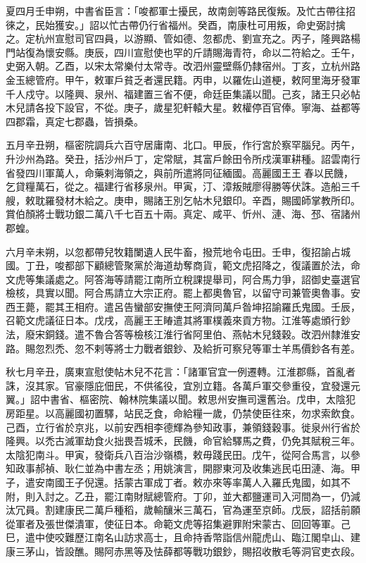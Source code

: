 \begin{pinyinscope}
 夏四月壬申朔，中書省臣言：「唆都軍士擾民，故南劍等路民復叛。及忙古帶往招徠之，民始獲安。」詔以忙古帶仍行省福州。癸酉，南康杜可用叛，命史弼討擒之。定杭州宣慰司官四員，以游顯、管如德、忽都虎、劉宣充之。丙子，隆興路楊門站復為懷安縣。庚辰，四川宣慰使也罕的斤請賜海青符，命以二符給之。壬午，史弼入朝。乙酉，以宋太常樂付太常寺。改泗州靈壁縣仍隸宿州。丁亥，立杭州路金玉總管府。甲午，敕軍戶貧乏者還民籍。丙申，以羅佐山道梗，敕阿里海牙發軍千人戍守。以隆興、泉州、福建置三省不便，命廷臣集議以聞。己亥，諸王只必帖木兒請各投下設官，不從。庚子，歲星犯軒轅大星。敕權停百官俸。寧海、益都等四郡霜，真定七郡蟲，皆損桑。



 五月辛丑朔，樞密院調兵六百守居庸南、北口。甲辰，作行宮於察罕腦兒。丙午，升沙州為路。癸丑，括沙州戶丁，定常賦，其富戶餘田令所戍漢軍耕種。詔雲南行省發四川軍萬人，命藥剌海領之，與前所遣將同征緬國。高麗國王王春以民饑，乞貸糧萬石，從之。福建行省移泉州。甲寅，汀、漳叛賊廖得勝等伏誅。造船三千艘，敕耽羅發材木給之。庚申，賜諸王別乞帖木兒銀印。辛酉，賜國師掌教所印。賞伯顏將士戰功銀二萬八千七百五十兩。真定、咸平、忻州、漣、海、邳、宿諸州郡蝗。



 六月辛未朔，以忽都帶兒牧籍闌遺人民牛畜，撥荒地令屯田。壬申，復招諭占城國。丁丑，唆都部下顧總管聚黨於海道劫奪商貨，範文虎招降之，復議置於法，命文虎等集議處之。阿答海等請罷江南所立稅課提舉司，阿合馬力爭，詔御史臺選官檢核，具實以聞。阿合馬請立大宗正府。罷上都奧魯官，以留守司兼管奧魯事。安西王薨，罷其王相府。遣呂告蠻部安撫使王阿濟同萬戶昝坤招諭羅氏鬼國。壬辰，召範文虎議征日本。戊戌，高麗王王睶遣其將軍樸義來貢方物。江淮等處頒行鈔法，廢宋銅錢。遣不魯合答等檢核江淮行省阿里伯、燕帖木兒錢穀。改泗州隸淮安路。賜忽烈禿、忽不剌等將士力戰者銀鈔、及給折可察兒等軍士羊馬價鈔各有差。



 秋七月辛丑，廣東宣慰使帖木兒不花言：「諸軍官宜一例遷轉。江淮郡縣，首亂者誅，沒其家。官豪隱庇佃民，不供徭役，宜別立籍。各萬戶軍交參重役，宜發還元翼。」詔中書省、樞密院、翰林院集議以聞。敕思州安撫司還舊治。戊申，太陰犯房距星。以高麗國初置驛，站民乏食，命給糧一歲，仍禁使臣往來，勿求索飲食。己酉，立行省於京兆，以前安西相李德輝為參知政事，兼領錢穀事。徙泉州行省於隆興。以禿古滅軍劫食火拙畏吾城禾，民饑，命官給驛馬之費，仍免其賦稅三年。太陰犯南斗。甲寅，發衛兵八百治沙嶺橋，敕毋踐民田。戊午，從阿合馬言，以參知政事郝禎、耿仁並為中書左丞；用姚演言，開膠東河及收集逃民屯田漣、海。甲子，遣安南國王子倪還。括蒙古軍成丁者。敕亦來等率萬人入羅氏鬼國，如其不附，則入討之。乙丑，罷江南財賦總管府。丁卯，並大都鹽運司入河間為一，仍減汰冗員。割建康民二萬戶種稻，歲輸釀米三萬石，官為運至京師。戊辰，詔括前願從軍者及張世傑潰軍，使征日本。命範文虎等招集避罪附宋蒙古、回回等軍。己巳，遣中使咬難歷江南名山訪求高士，且命持香幣詣信州龍虎山、臨江閣皁山、建康三茅山，皆設醮。賜阿赤黑等及怯薛都等戰功銀鈔，賜招收散毛等洞官吏衣段。




\end{pinyinscope}
